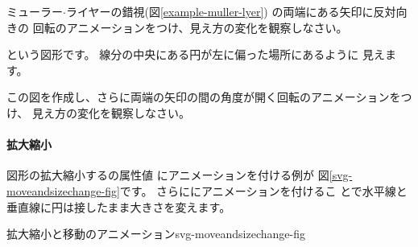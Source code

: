 \iffalse
これらの例では図形が画面に表示されるとすぐにアニメーションが始まります。
開始時間は\AttribA{begin}を用いて指定することができます。
\fi
\iffalse
\ProbwithSol{svg-bourdon-animation}{ブルドンの錯視(アニメーション付き)}
{svg-bourdon-animation}
{\keysubE{ブルドン}{錯視}{の}\IndexSet{ブルドンの錯視}{}{}{}{}(図
 \ref{bourdon})の錯視に回転のアニメーションをつけてどのように見え方が変わるか
 調べなさい。}
\fi
\begin{Problem}\upshape
 ミューラー$\cdot$ライヤーの錯視(図\ref{example-muller-lyer})
の両端にある矢印に反対向きの
回転のアニメーションをつけ、見え方の変化を観察しなさい。
\end{Problem}
{
という図形です。%
線分の中央にある円が左に偏った場所にあるように
 見えます。
\iffalse\begin{enumerate}
 \item この図を作成しなさい。
 \item 両端の矢印の間の角度が開く回転のアニメーションをつけ、
見え方の変化を観察しなさい。
\end{enumerate}
\else
この図を作成し、さらに両端の矢印の間の角度が開く回転のアニメーションをつけ、
見え方の変化を観察しなさい。%
\fi}
\paragraph{拡大縮小}
図形の拡大縮小するの属性値
にアニメーションを付ける例が
%
図\ref{svg-moveandsizechange-fig}です。%
さらににアニメーションを付けるこ
とで水平線と垂直線に円は接したまま大きさを変えます。

{拡大縮小と移動のアニメーション}{svg-moveandsizechange-fig}

